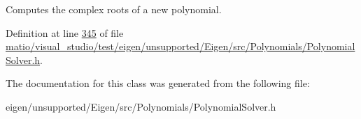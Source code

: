 Computes the complex roots of a new polynomial. 

Definition at line \hyperlink{matio_2visual__studio_2test_2eigen_2unsupported_2_eigen_2src_2_polynomials_2_polynomial_solver_8h_source_l00345}{345} of file \hyperlink{matio_2visual__studio_2test_2eigen_2unsupported_2_eigen_2src_2_polynomials_2_polynomial_solver_8h_source}{matio/visual\+\_\+studio/test/eigen/unsupported/\+Eigen/src/\+Polynomials/\+Polynomial\+Solver.\+h}.



The documentation for this class was generated from the following file\+:\begin{DoxyCompactItemize}
\item 
eigen/unsupported/\+Eigen/src/\+Polynomials/\+Polynomial\+Solver.\+h\end{DoxyCompactItemize}
